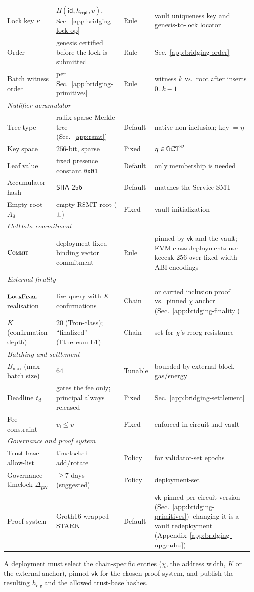\begin{longtable}{p{3.0cm}p{4.2cm}p{2.0cm}p{3.4cm}}
Lock key $\kappa$ & $H(\mathsf{id},h_\mathsf{rcpt},v)$, Sec.~\ref{app:bridging-lock-op} & Rule & vault uniqueness key and genesis-to-lock locator \\
Order & genesis certified before the lock is submitted & Rule & Sec.~\ref{app:bridging-order} \\
Batch witness order & per Sec.~\ref{app:bridging-primitives} & Rule & witness $k$ vs.\ root after inserts $0..k{-}1$ \\
\hline
\multicolumn{4}{l}{\textit{Nullifier accumulator}}\\
\hline
Tree type & radix sparse Merkle tree (Sec.~\ref{app:rsmt}) & Default & native non-inclusion; key $=\eta$ \\
Key space & $256$-bit, sparse & Fixed & $\eta \in \mathbb{OCT}^{32}$ \\
Leaf value & fixed presence constant \texttt{0x01} & Default & only membership is needed \\
Accumulator hash & $\mathsf{SHA\text{-}256}$ & Default & matches the Service SMT \\
Empty root $A_\emptyset$ & empty-RSMT root ($\bot$) & Fixed & vault initialization \\
\hline
\multicolumn{4}{l}{\textit{Calldata commitment}}\\
\hline
$\Call{Commit}{}$ & deployment-fixed binding vector commitment & Rule & pinned by $\mathsf{vk}$ and the vault; EVM-class deployments use keccak-256 over fixed-width ABI encodings \\
\hline
\multicolumn{4}{l}{\textit{External finality}}\\
\hline
$\Call{LockFinal}{}$ realization & live query with $K$ confirmations & Chain & or carried inclusion proof vs.\ pinned $\chi$ anchor (Sec.~\ref{app:bridging-finality}) \\
$K$ (confirmation depth) & $20$ (Tron-class); ``finalized'' (Ethereum L1) & Chain & set for $\chi$'s reorg resistance \\
\hline
\multicolumn{4}{l}{\textit{Batching and settlement}}\\
\hline
$B_{\max}$ (max batch size) & $64$ & Tunable & bounded by external block gas/energy \\
Deadline $t_d$ & gates the fee only; principal always released & Fixed & Sec.~\ref{app:bridging-settlement} \\
Fee constraint & $v_\mathsf{f} \le v$ & Fixed & enforced in circuit and vault \\
\hline
\multicolumn{4}{l}{\textit{Governance and proof system}}\\
\hline
Trust-base allow-list & timelocked add/rotate & Policy & for validator-set epochs \\
Governance timelock $\Delta_\mathsf{gov}$ & $\ge 7$ days (suggested) & Policy & deployment-set \\
Proof system & Groth16-wrapped STARK & Default & $\mathsf{vk}$ pinned per circuit version (Sec.~\ref{app:bridging-primitives}); changing it is a vault redeployment (Appendix~\ref{app:bridging-upgrades}) \\
\end{longtable}

A deployment must select the chain-specific entries ($\chi$, the address width, $K$ or the external anchor), pinned $\mathsf{vk}$ for the chosen proof system, and publish the resulting $h_\mathsf{cfg}$ and the allowed trust-base hashes.
